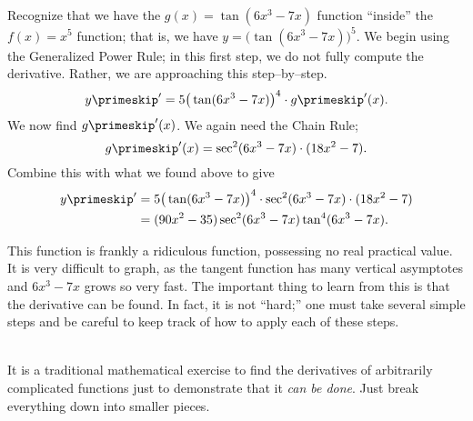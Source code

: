 {Recognize that we have the $g(x)=\tan(6x^3-7x)$ function ``inside'' the $f(x)=x^5$ function; that is, we have $y = \big(\tan(6x^3-7x)\big)^5$. We begin using the Generalized Power Rule; in this first step, we do not fully compute the derivative. Rather, we are approaching this step--by--step.
$$y\primeskip' = 5\big(\tan(6x^3-7x)\big)^4\cdot g\primeskip'(x).$$
We now find $g\primeskip'(x)$. We again need the Chain Rule; $$g\primeskip'(x) = \sec^2(6x^3-7x)\cdot(18x^2-7).$$ Combine this with what we found above to give
\begin{align*}
y\primeskip' &= 5\big(\tan(6x^3-7x)\big)^4\cdot\sec^2(6x^3-7x)\cdot(18x^2-7)\\ 
&= (90x^2-35)\sec^2(6x^3-7x)\tan^4(6x^3-7x).
\end{align*}

This function is frankly a ridiculous function, possessing no real practical value. It is very difficult to graph, as the tangent function has many vertical asymptotes and $6x^3-7x$ grows so very fast. The important thing to learn from this is that the derivative can be found. In fact, it is not ``hard;'' one must take several simple steps and be careful to keep track of how to apply each of these steps.%
}\\

It is a traditional mathematical exercise to find the derivatives of arbitrarily complicated functions just to demonstrate that it \textit{can be done}. Just break everything down into smaller pieces. \\


